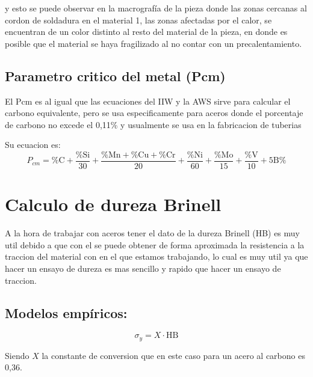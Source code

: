 \documentclass[12pt,a4paper]{article}
\begin{document}
y esto se puede observar en la macrografía de la pieza donde las zonas cercanas al cordon de soldadura en el material 1, las zonas afectadas por el calor, se encuentran de un color distinto al resto del material de la pieza, en donde es posible que el material se haya fragilizado al no contar con un precalentamiento.

\subsection{Parametro critico del metal (Pcm)}
El Pcm es al igual que las ecuaciones del IIW y la AWS sirve para calcular el carbono equivalente, pero se usa especificamente para aceros donde el porcentaje de carbono no excede el 0,11\% y usualmente se usa en la fabricacion de tuberias

Su ecuacion es:
\begin{equation}
    P_{cm} = \text{\%C} + \frac{\text{\%Si}}{30} + \frac{\text{\%Mn}+\text{\%Cu}+\text{\%Cr}}{20} + \frac{\text{\%Ni}}{60} + \frac{\text{\%Mo}}{15} + \frac{\text{\%V}}{10} + \text{5B\%}
\end{equation}

\section{Calculo de dureza Brinell}

A la hora de trabajar con aceros tener el dato de la dureza Brinell (HB) es muy util debido a que con el se puede obtener de forma aproximada la resistencia a la traccion del material con en el que estamos trabajando, 
lo cual es muy util ya que hacer un ensayo de dureza es mas sencillo y rapido que hacer un ensayo de traccion.

\subsection{Modelos empíricos:}

\begin{equation}
    \sigma_y = X \cdot \text{HB}
\end{equation}

Siendo $X$ la constante de conversion que en este caso para un acero al carbono es 0,36.
\end{document}
